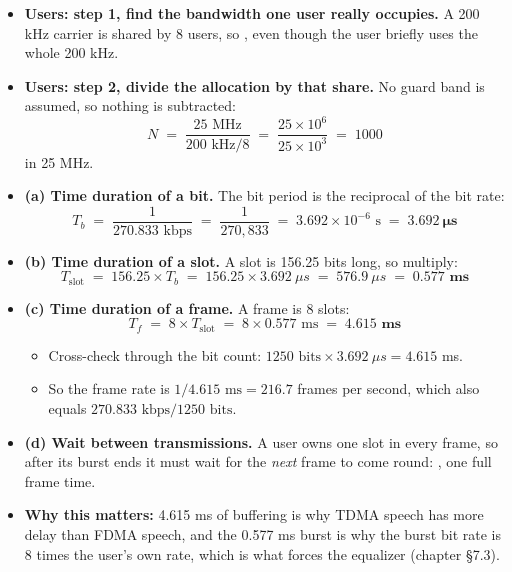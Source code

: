 \begin{itemize}
  \item \textbf{Users: step 1, find the bandwidth one user really occupies.} A 200 kHz carrier
        is shared by 8 users, so , even though the
        user briefly uses the whole 200 kHz.
  \item \textbf{Users: step 2, divide the allocation by that share.} No guard band is assumed,
        so nothing is subtracted:
        \[ N \;=\; \frac{25 \text{ MHz}}{200 \text{ kHz} / 8}
           \;=\; \frac{25 \times 10^6}{25 \times 10^3} \;=\; 1000 \]
         in 25 MHz.
  \item \textbf{(a) Time duration of a bit.} The bit period is the reciprocal of the bit rate:
        \[ T_b \;=\; \frac{1}{270.833 \text{ kbps}} \;=\; \frac{1}{270{,}833}
           \;=\; 3.692 \times 10^{-6} \text{ s} \;=\; \mathbf{3.692\ \mu s} \]
  \item \textbf{(b) Time duration of a slot.} A slot is 156.25 bits long, so multiply:
        \[ T_{\text{slot}} \;=\; 156.25 \times T_b \;=\; 156.25 \times 3.692\ \mu s
           \;=\; 576.9\ \mu s \;=\; \mathbf{0.577 \text{ ms}} \]
  \item \textbf{(c) Time duration of a frame.} A frame is 8 slots:
        \[ T_f \;=\; 8 \times T_{\text{slot}} \;=\; 8 \times 0.577 \text{ ms}
           \;=\; \mathbf{4.615 \text{ ms}} \]
  \begin{itemize}
    \item Cross-check through the bit count: $1250 \text{ bits} \times 3.692\ \mu s
          = 4.615$ ms. \checkmark
    \item So the frame rate is $1/4.615 \text{ ms} = 216.7$ frames per second, which also equals
          $270.833 \text{ kbps} / 1250 \text{ bits}$. \checkmark
  \end{itemize}
  \item \textbf{(d) Wait between transmissions.} A user owns one slot in every frame, so after
        its burst ends it must wait for the \emph{next} frame to come round:
        , one full frame time.
  \item \textbf{Why this matters:} 4.615 ms of buffering is why TDMA speech has more delay than
        FDMA speech, and the 0.577 ms burst is why the burst bit rate is 8 times the user's own
        rate, which is what forces the equalizer (chapter \S7.3).
\end{itemize}

